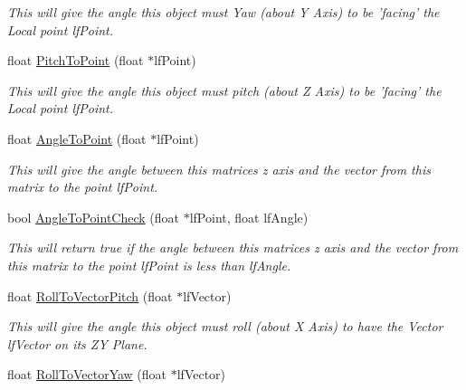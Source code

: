 \begin{DoxyCompactItemize}
\begin{DoxyCompactList}\small\item\em This will give the angle this object must Yaw (about Y Axis) to be 'facing' the Local point lfPoint. \end{DoxyCompactList}\item 
\hypertarget{classc_matrix4_ac1c46f4ef1c8ffff6419222207e26d26}{
float \hyperlink{classc_matrix4_ac1c46f4ef1c8ffff6419222207e26d26}{PitchToPoint} (float $\ast$lfPoint)}
\label{classc_matrix4_ac1c46f4ef1c8ffff6419222207e26d26}

\begin{DoxyCompactList}\small\item\em This will give the angle this object must pitch (about Z Axis) to be 'facing' the Local point lfPoint. \end{DoxyCompactList}\item 
\hypertarget{classc_matrix4_ae58f483946b6f8e973d459594ae9870a}{
float \hyperlink{classc_matrix4_ae58f483946b6f8e973d459594ae9870a}{AngleToPoint} (float $\ast$lfPoint)}
\label{classc_matrix4_ae58f483946b6f8e973d459594ae9870a}

\begin{DoxyCompactList}\small\item\em This will give the angle between this matrices z axis and the vector from this matrix to the point lfPoint. \end{DoxyCompactList}\item 
\hypertarget{classc_matrix4_a0e6077b826b967c94f44183670225b95}{
bool \hyperlink{classc_matrix4_a0e6077b826b967c94f44183670225b95}{AngleToPointCheck} (float $\ast$lfPoint, float lfAngle)}
\label{classc_matrix4_a0e6077b826b967c94f44183670225b95}

\begin{DoxyCompactList}\small\item\em This will return true if the angle between this matrices z axis and the vector from this matrix to the point lfPoint is less than lfAngle. \end{DoxyCompactList}\item 
\hypertarget{classc_matrix4_acb360bcac4f8ec6b2c74f567e10f5bec}{
float \hyperlink{classc_matrix4_acb360bcac4f8ec6b2c74f567e10f5bec}{RollToVectorPitch} (float $\ast$lfVector)}
\label{classc_matrix4_acb360bcac4f8ec6b2c74f567e10f5bec}

\begin{DoxyCompactList}\small\item\em This will give the angle this object must roll (about X Axis) to have the Vector lfVector on its ZY Plane. \end{DoxyCompactList}\item 
\hypertarget{classc_matrix4_aa5c96c056490046056fffcdfe446c5ca}{
float \hyperlink{classc_matrix4_aa5c96c056490046056fffcdfe446c5ca}{RollToVectorYaw} (float $\ast$lfVector)}
\label{classc_matrix4_aa5c96c056490046056fffcdfe446c5ca}


\end{DoxyCompactItemize}
